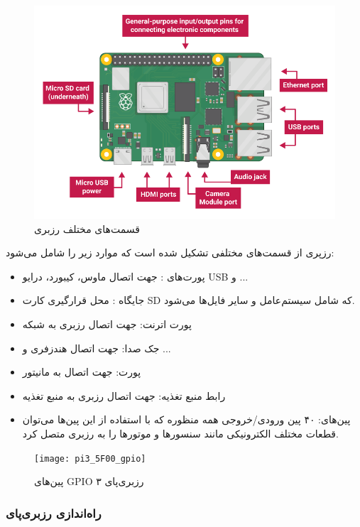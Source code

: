 \documentclass[12pt]{article}
\begin{document}
\begin{figure}[h]
	\begin{center}
		\includegraphics[width=.50\textwidth]{pi-labelled-names}
	\end{center}
	\caption{قسمت‌های مختلف رزبری}
\end{figure}


 رزپری از قسمت‌های مختلفی تشکیل شده است که موارد زیر را شامل می‌شود:
 \\
 
\begin{itemize}
	\item 
	پورت‌های :  جهت اتصال ماوس، کیبورد، درایو USB و ...
	\item 
	
	جایگاه : محل قرارگیری کارت SD که شامل سیستم‌عامل و سایر فایل‌ها می‌شود.
	\item 
	
	پورت اترنت: جهت اتصال رزبری به شبکه
	
	\item 
	جک صدا: جهت اتصال هندزفری و ...
	\item 
	
	پورت:  جهت اتصال به مانیتور
	\item 
رابط منبع تغذیه: جهت اتصال رزبری به منبع تغذیه
	
	\item
	پین‌های: 
	 ۴۰ پین ورودی/خروجی همه منظوره که با استفاده از این پین‌ها می‌توان قطعات مختلف الکترونیکی مانند سنسورها و موتورها را به رزبری متصل کرد.
\end{itemize}




\begin{figure}[h]
	\begin{center}
		\texttt{[image: pi3\_5F00\_gpio]}
	\end{center}
	\caption{پین‌های GPIO رزبری‌پای ۳}
\end{figure}



\subsubsection{‌راه‌اندازی رزبری‌پای}
\end{document}
